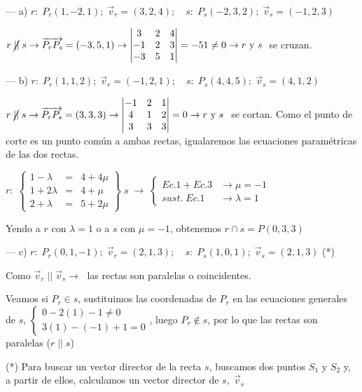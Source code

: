\begin{proofw}\renewcommand{\qedsymbol}{$\diamond$}
	--- a) $r:\; P_r(1,-2,1); \; \vec v_r=(3,2,4); \quad s:\; P_s(-2,3,2); \; \vec v_s=(-1,2,3)$
	
	\noindent $r\;\cancel{||}\;s \to \overrightarrow{P_rP_s}=(-3,5,1) \to \left| \begin{matrix} 3&2&4\\-1&2&3\\-3&5&1 \end{matrix}\right|=-51\neq 0 \to r \text{ y } s\;$ se cruzan.
	
\noindent --- b) $r:\; P_r(1,1,2); \; \vec v_r=(-1,2,1); \quad s:\; P_s(4,4,5); \; \vec v_s=(4,1,2)$

\noindent $r\;\cancel{||}\;s \to \overrightarrow{P_rP_s}=(3,3,3) \to \left| \begin{matrix} -1&2&1\\4&1&2\\3&3&3 \end{matrix}\right|= 0 \to r \text{ y } s\;$ se cortan. Como el punto de corte es un punto común a ambas rectas, igualaremos las ecuaciones paramétricas de las dos rectas.

\noindent $r:\; \left\{ \begin{matrix}
 1-\lambda&=&4+4\mu \\ 1+2\lambda &=& 4+\mu \\ 2+\lambda &=& 5+2\mu 	
 \end{matrix} \right\} \; s \;\to \; \begin{cases} Ec.1 + Ec.3 &\to \mu=-1 \\ sust.\; Ec.1 &\to \lambda =1 \end{cases}$

\noindent Yendo a $r$ con $\lambda=1$ o a $s$ con $\mu=-1$, obtenemos $r \cap s = P(0,3,3)$

\noindent --- c) $r:\; P_r(0,1,-1); \; \vec v_r=(2,1,3); \quad s:\; P_s(1,0,1); \; \vec v_s=(2,1,3)$ (*)

\noindent Como $\vec v_r\;||\; \vec v_s \to \;$ las rectas son paralelas o coincidentes.

\noindent Veamos si $P_r \in s $, sustituimos las coordenadas de $P_r$ en las ecuaciones generales de $s$, $\begin{cases} 0-2(1)-1\neq 0 \\ 3(1)-(-1)+1=0 \end{cases}$, luego $P_r \notin s$, por lo que las rectas son paralelas ($r\;||\; s$)

\noindent (*) \textcolor{gris}{Para buscar un vector director de la recta $s$, buscamos dos puntos $S_1 \text{ y } S_2$ y, a partir de ellos, calculamos un vector director de $s,\; \vec v_s$}


\end{proofw}
